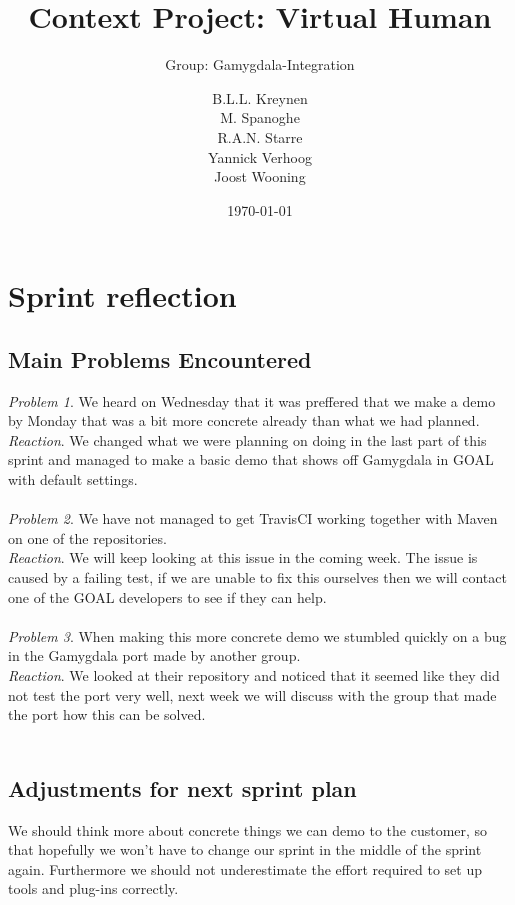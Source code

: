 \documentclass{scrartcl}
\begin{document}
\title{Context Project: Virtual Human}
\subtitle{Group: Gamygdala-Integration}
\date{\today{}}

\author{
    \begin{tabular}{l r}
      B.L.L. Kreynen\\
      M. Spanoghe\\
      R.A.N. Starre\\
      Yannick Verhoog\\
      Joost Wooning\\
    \end{tabular}
}

\maketitle \thispagestyle{empty} \pagebreak

\section{Sprint reflection}

\subsection{Main Problems Encountered}

\emph{Problem 1}. We heard on Wednesday that it was preffered that we make a demo by Monday that was a bit more concrete already than what we had planned.\\
\emph{Reaction}. We changed what we were planning on doing in the last part of this sprint and managed to make a basic demo that shows off Gamygdala in GOAL with default settings.\\
\\
\emph{Problem 2}. We have not managed to get TravisCI working together with Maven on one of the repositories.\\
\emph{Reaction}. We will keep looking at this issue in the coming week. The issue is caused by a failing test, if we are unable to fix this ourselves then we will contact one of the GOAL developers to see if they can help.\\
\\
\emph{Problem 3}. When making this more concrete demo we stumbled quickly on a bug in the Gamygdala port made by another group.\\
\emph{Reaction}. We looked at their repository and noticed that it seemed like they did not test the port very well, next week we will discuss with the group that made the port how this can be solved.\\
\\


\subsection{Adjustments for next sprint plan}
We should think more about concrete things we can demo to the customer, so that hopefully we won't have to change our sprint in the middle of the sprint again. Furthermore we should not underestimate the effort required to set up tools and plug-ins correctly.
\end{document}
